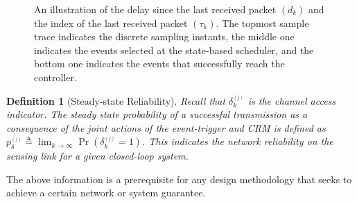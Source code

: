 \documentclass[journal]{IEEEtran}
\newtheorem{definition}{Definition}[section]
\begin{document}
\begin{figure}[tb]
 \caption{An illustration of the delay since the last received packet $(d_k)$ and the index of the last received packet $(\tau_k)$. The topmost sample trace indicates the discrete sampling instants, the middle one indicates the events selected at the state-based scheduler, and the bottom one indicates the events that successfully reach the controller. } \label{Fig:TimeLines}
\end{figure}

\begin{definition}[Steady-state Reliability]
Recall that $\delta^{_{(j)}}_k$ is the channel access indicator. The steady state probability of a successful transmission as a consequence of the joint actions of the event-trigger and CRM is defined as $p^{_{(j)}}_{\delta} \triangleq \lim_{k \rightarrow \infty} \Pr(\delta^{_{(j)}}_k = 1)$. This indicates the network reliability on the sensing link for a given closed-loop system.
\end{definition}

The above information is a prerequisite for any design methodology that seeks to achieve a certain network or system guarantee.
\end{document}
